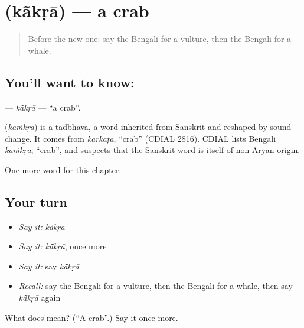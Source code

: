 \section[\texorpdfstring{\bn{কাঁকড়া} (kā̃kṛā)}{কাঁকড়া (kā̃kṛā)}]{ (kā̃kṛā) — a crab}

\label{lesson:BN-C166-kakra}



\begin{quote}
Before the new one: say the Bengali for a vulture, then the Bengali for a whale.
\end{quote}

\subsection*{You'll want to know: }
\textbf{} — \emph{kā̃kṛā} — \textquotedblleft{}a crab\textquotedblright{}.

\begin{cousinweb}
\textbf{} (\emph{kāṁkṛā}) is a tadbhava, a word inherited from Sanskrit and reshaped by sound change. It comes from \emph{karkaṭa}, \textquotedblleft{}crab\textquotedblright{} (CDIAL 2816). CDIAL lists Bengali \emph{kāṁkṛā}, \textquotedblleft{}crab\textquotedblright{}, and suspects that the Sanskrit word is itself of non-Aryan origin.
\end{cousinweb}

\begin{grammarlens}[title={What you've built}]
One more word for this chapter.
\end{grammarlens}

\subsection*{Your turn}
\begin{itemize}
\raggedright
  \item \emph{Say it:} \emph{kā̃kṛā}
  \item \emph{Say it:} \emph{kā̃kṛā}, once more
  \item \emph{Say it:} say \emph{kā̃kṛā}
  \item \emph{Recall:} say the Bengali for a vulture, then the Bengali for a whale, then say \emph{kā̃kṛā} again
\end{itemize}

\begin{tcolorbox}[breakable,colback=teal!4,colframe=teal!35!black,title={Before you move on}]
What does  mean? (\textquotedblleft{}A crab\textquotedblright{}.) Say it once more.
\end{tcolorbox}
